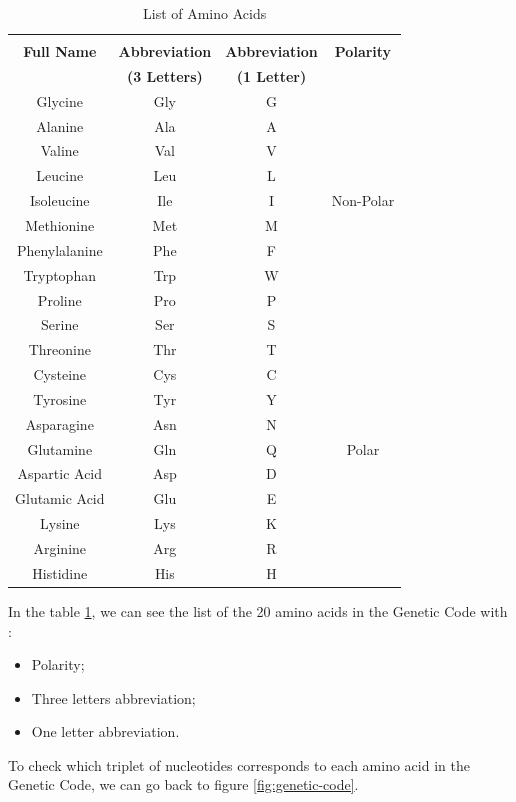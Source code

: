 \begin{table}[h!]
\begin{tabular}{ |c|c|c|c| }
	\hline
	 & & & \\
	\textbf{Full Name} & \textbf{Abbreviation} & \textbf{Abbreviation} & \textbf{Polarity} \\
	 & \textbf{(3 Letters)} & \textbf{(1 Letter)} & \\
	\hline
 Glycine & Gly & G & \\  
 Alanine & Ala & A & \\ 
 Valine & Val & V & \\
 Leucine & Leu & L & \\
 Isoleucine & Ile & I & Non-Polar \\
 Methionine & Met & M & \\
 Phenylalanine & Phe & F & \\
 Tryptophan & Trp & W & \\
 Proline & Pro & P & \\
 	\hline
 Serine & Ser & S & \\
 Threonine & Thr & T & \\
 Cysteine & Cys & C & \\
 Tyrosine & Tyr & Y & \\
 Asparagine & Asn & N & \\
 Glutamine & Gln & Q & Polar \\
 Aspartic Acid & Asp & D & \\
 Glutamic Acid & Glu & E & \\
 Lysine & Lys & K & \\
 Arginine & Arg & R & \\
 Histidine & His & H & \\
	\hline

\end{tabular}
\caption{List of Amino Acids}
\label{table:amino-acids}
\end{table}

\vspace{2em}

In the table \ref{table:amino-acids}, we can see the list of the 20 amino acids in the Genetic Code with :
\begin{itemize}
	\item Polarity;
	\item Three letters abbreviation;
	\item One letter abbreviation.
\end{itemize}

To check which triplet of nucleotides corresponds to each amino acid in the Genetic Code, we can go back to figure \ref{fig:genetic-code}.

